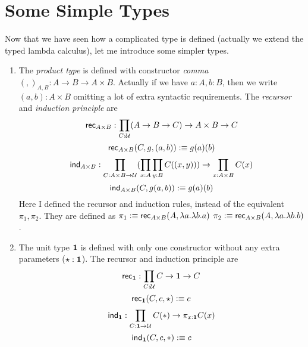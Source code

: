 \section{Some Simple Types}
Now that we have seen how a complicated type is defined (actually we
extend the typed lambda calculus), let me introduce some simpler types.
\newcommand{\inl}{\name{inl}}
\newcommand{\inr}{\name{inr}}
\begin{enumerate}
    \item The {\it product type} is defined with constructor {\it comma}
    $(,)_{A,B}:A\to B\to A\times B$. Actually if we have $a: A,b: B$, then
    we write $(a, b): A\times B$ omitting a lot of extra syntactic requirements.
    The {\it recursor} and {\it induction principle} are
    $$
    \text{\sf rec}_{A\times B}: \prod_{C:\mathcal{U}}(A\to B\to C)\to A\times B\to C \\
    $$
    $$
    \text{\sf rec}_{A\times B}(C,g,(a,b)) :\equiv g(a)(b)
    $$
    $$
    \text{\sf ind}_{A\times B}:\prod_{C:A\times B\to\mathcal{U}}
        (\prod_{x:A}\prod_{y:B}C((x,y)))\to\prod_{x:A\times B}C(x)
    $$
    $$
        \text{\sf ind}_{A\times B}(C,g(a,b)):\equiv g(a)(b)
    $$
    Here I defined the recursor and induction rules, instead of the
    equivalent $\pi_1,\pi_2$. They are defined as 
    $\pi_1:\equiv\text{\sf rec}_{A\times B}(A,\lambda a.\lambda b. a)$
    $\pi_2:\equiv\text{\sf rec}_{A\times B}(A,\lambda a.\lambda b. b)$.
    \item The unit type $\mathbf{1}$ is defined with only one constructor without
    any extra parameters ($\star:\mathbf{1}$). The recursor and induction principle
    are 
    $$
        \text{\sf rec}_{\mathbf{1}}:\prod_{C:\mathcal{U}}C\to\mathbf{1}\to C
    $$
    $$ 
        \text{\sf rec}_{\mathbf{1}}(C,c,\star) :\equiv c
    $$
    $$
        \text{\sf ind}_{\mathbf{1}}:\prod_{C:\mathbf{1}\to\mathcal{U}}C(\ast)\to\pi_{x:\mathbf{1}}C(x)
    $$
    $$
        \text{\sf ind}_{\mathbf{1}}(C,c,\ast) :\equiv c
    $$


\end{enumerate}
